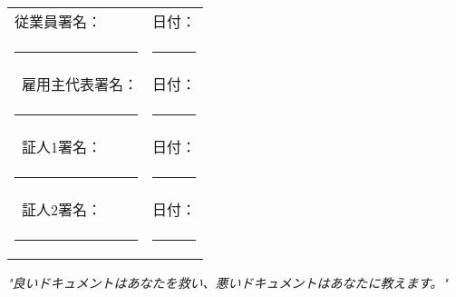 \documentclass[a4paper,11pt]{article}
\begin{document}
\vspace{2em}
\noindent\begin{tabular}{@{}p{8cm}p{8cm}@{}}
従業員署名： & 日付： \\
\rule{8cm}{0.4pt} & \rule{8cm}{0.4pt} \\\
雇用主代表署名： & 日付： \\
\rule{8cm}{0.4pt} & \rule{8cm}{0.4pt} \\\
証人1署名： & 日付： \\
\rule{8cm}{0.4pt} & \rule{8cm}{0.4pt} \\\
証人2署名： & 日付： \\
\rule{8cm}{0.4pt} & \rule{8cm}{0.4pt}
\end{tabular}

\vfill

\begin{center}
    \textit{"良いドキュメントはあなたを救い、悪いドキュメントはあなたに教えます。"}
\end{center}
\end{document}

